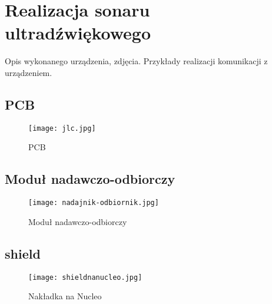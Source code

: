 \chapter[Realizacja sonaru ultradźwiękowego]{Realizacja sonaru ultradźwiękowego}

\label{chapter:realizacja}

Opis wykonanego urządzenia, zdjęcia.
Przykłady realizacji komunikacji z urządzeniem.

\section{PCB}


\begin{figure}[ht!]
    \centering
    \texttt{[image: jlc.jpg]}
    \caption{PCB}
    \label{fig:pcb}
\end{figure}

\section{Moduł nadawczo-odbiorczy}

\begin{figure}[ht!]
    \centering
    \texttt{[image: nadajnik-odbiornik.jpg]}
    \caption{Moduł nadawczo-odbiorczy}
    \label{fig:nadajnikodbiornik}
\end{figure}

\section{shield}

\begin{figure}[ht!]
    \centering
    \texttt{[image: shieldnanucleo.jpg]}
    \caption{Nakładka na Nucleo}
    \label{fig:shieldnucleo}
\end{figure}